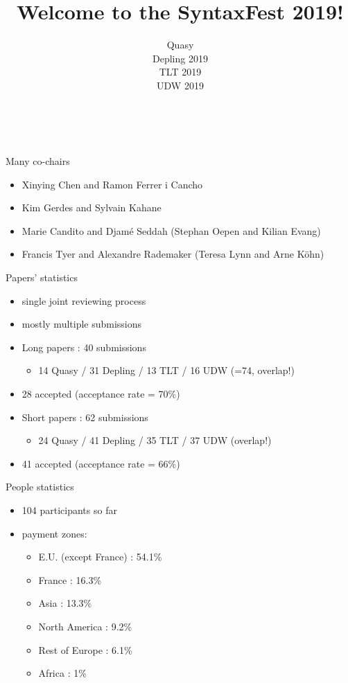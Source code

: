 \documentclass{beamer}
\author{\footnotesize{Quasy\\Depling 2019\\TLT 2019\\UDW 2019}}
\title[SyntaxFest 2019 - Paris - 26-30 August]{Welcome to the SyntaxFest 2019!}
\date{\hlcolor{Paris}\\{\ccolor{26-30 August 2019}}}
\begin{document}
\frame[plain]{\titlepage}


\begin{frame}{Many co-chairs}
  \begin{itemize}
    \item Xinying Chen and Ramon Ferrer i Cancho
    \item Kim Gerdes and Sylvain Kahane
    \item Marie Candito and Djamé Seddah (Stephan Oepen and Kilian Evang)
    \item Francis Tyer and Alexandre Rademaker (Teresa Lynn and Arne Köhn)
  \end{itemize}
\end{frame}

\begin{frame}{Papers' statistics}

\begin{itemize}
\item single joint reviewing process
\item mostly multiple submissions
\vspace{2mm}
\item Long papers : 40 submissions
\begin{itemize}
\item 14 Quasy / 31 Depling / 13 TLT / 16 UDW (=74, overlap!)
\end{itemize}
\item 28 accepted (acceptance rate = 70\%)

\item Short papers : 62 submissions
\begin{itemize}
\item 24 Quasy / 41 Depling / 35 TLT / 37 UDW (overlap!)
\end{itemize}
\item 41 accepted (acceptance rate = 66\%)

\end{itemize}

\end{frame}


\begin{frame}{People statistics}

\begin{itemize}
\item 104 participants so far
\item payment zones:
\begin{itemize}
\item E.U. (except France) : 54.1\%
\item France : 16.3\%
\item Asia : 13.3\%
\item North America : 9.2\%
\item Rest of Europe : 6.1\%
\item Africa : 1\%
\end{itemize}

\end{itemize}

\end{frame}
\end{document}
